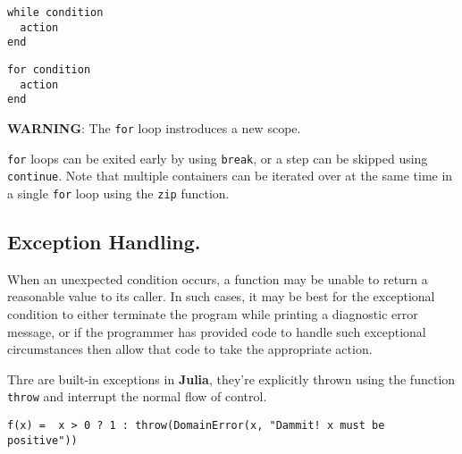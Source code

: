 \documentclass[
]{article}
\begin{document}
\begin{verbatim}
while condition
  action
end
\end{verbatim}

\begin{verbatim}
for condition
  action
end
\end{verbatim}

\textbf{WARNING}: The \texttt{for} loop instroduces a new scope.

\texttt{for} loops can be exited early by using \texttt{break}, or a
step can be skipped using \texttt{continue}. Note that multiple
containers can be iterated over at the same time in a single
\texttt{for} loop using the \texttt{zip} function.

\hypertarget{exception-handling.}{%
\subsection{\texorpdfstring{\textbf{Exception
Handling}.}{Exception Handling.}}\label{exception-handling.}}

When an unexpected condition occurs, a function may be unable to return
a reasonable value to its caller. In such cases, it may be best for the
exceptional condition to either terminate the program while printing a
diagnostic error message, or if the programmer has provided code to
handle such exceptional circumstances then allow that code to take the
appropriate action.

Thre are built-in exceptions in \textbf{Julia}, they're explicitly
thrown using the function \texttt{throw} and interrupt the normal flow
of control.

\begin{verbatim}
f(x) =  x > 0 ? 1 : throw(DomainError(x, "Dammit! x must be positive"))
\end{verbatim}
\end{document}
